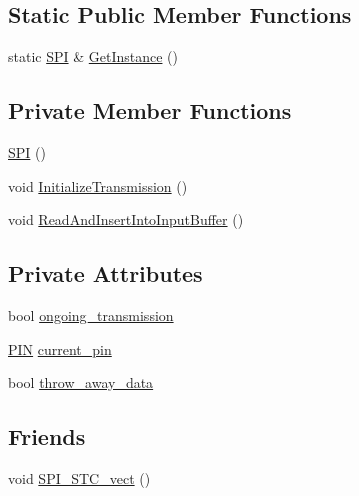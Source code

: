 \subsection*{Static Public Member Functions}
\begin{DoxyCompactItemize}
\item 
static \hyperlink{class_s_p_i___n_1_1_s_p_i}{S\-P\-I} \& \hyperlink{class_s_p_i___n_1_1_s_p_i_abc266ff9d817b8d4437d1da47fe8e7ae}{Get\-Instance} ()
\end{DoxyCompactItemize}
\subsection*{Private Member Functions}
\begin{DoxyCompactItemize}
\item 
\hyperlink{class_s_p_i___n_1_1_s_p_i_a8fec1a6e642a5758acf974b92e28a9e6}{S\-P\-I} ()
\item 
void \hyperlink{class_s_p_i___n_1_1_s_p_i_af973a5b4a970c3c01430037d578151ef}{Initialize\-Transmission} ()
\item 
void \hyperlink{class_s_p_i___n_1_1_s_p_i_a5f2091bd02e8adbe6814b12fb6e2057f}{Read\-And\-Insert\-Into\-Input\-Buffer} ()
\end{DoxyCompactItemize}
\subsection*{Private Attributes}
\begin{DoxyCompactItemize}
\item 
bool \hyperlink{class_s_p_i___n_1_1_s_p_i_aff61d4bfc6a6e0088c3653898b1e91b8}{ongoing\-\_\-transmission}
\item 
\hyperlink{struct_s_p_i___n_1_1_p_i_n}{P\-I\-N} \hyperlink{class_s_p_i___n_1_1_s_p_i_ac016c4eaed2db3f8b5523bf0d472ddd2}{current\-\_\-pin}
\item 
bool \hyperlink{class_s_p_i___n_1_1_s_p_i_a7b2d300478662920e6911cea751e1094}{throw\-\_\-away\-\_\-data}
\end{DoxyCompactItemize}
\subsection*{Friends}
\begin{DoxyCompactItemize}
\item 
void \hyperlink{class_s_p_i___n_1_1_s_p_i_a96543550133e0b0c6ae83faad5c0d68d}{S\-P\-I\-\_\-\-S\-T\-C\-\_\-vect} ()
\end{DoxyCompactItemize}


